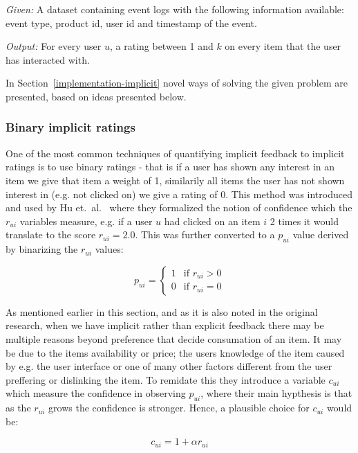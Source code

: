 \textit{Given:} A dataset containing event logs with the following information
available: event type, product id, user id and timestamp of the event.

\textit{Output:} For every user $u$, a rating between 1 and $k$ on every item that
the user has interacted with.

In Section~\ref{implementation-implicit} novel ways of solving the given
problem are presented, based on ideas presented below.

\subsubsection{Binary implicit ratings}

One of the most common techniques of quantifying implicit feedback to implicit
ratings is to use binary ratings - that is if a user has shown any interest in
an item we give that item a weight of 1, similarily all items the user has not
shown interest in (e.g. not clicked on) we give a rating of 0. This method was
introduced and used by Hu et.\ al.~\cite{Hu2008} where they formalized the
notion of confidence which the $r_{ui}$ variables measure, e.g. if a user $u$
had clicked on an item $i$ 2 times it would translate to the score $r_{ui} =
2.0$. This was further converted to a $p_{ui}$ value derived by binarizing the
$r_{ui}$ values:

\begin{equation}
  p_{ui} =
  \begin{cases}
    1 & \text{if $r_{ui} > 0$} \\
    0 & \text{if $r_{ui} = 0$}
  \end{cases}
\end{equation}

As mentioned earlier in this section, and as it is also noted in the original
research, when we have implicit rather than explicit feedback there may be
multiple reasons beyond preference that decide consumation of an item. It may
be due to the items availability or price; the users knowledge of the item
caused by e.g. the user interface or one of many other factors different from
the user preffering or dislinking the item. To remidate this they introduce a
variable $c_{ui}$ which measure the confidence in observing $p_{ui}$, where
their main hypthesis is that as the $r_{ui}$ grows the confidence is stronger.
Hence, a plausible choice for $c_{ui}$ would be:

\begin{equation}
c_{ui} = 1 + \alpha r_{ui}
\end{equation}

